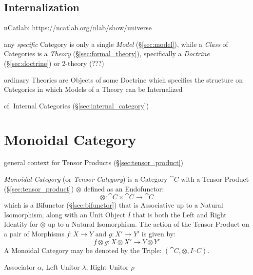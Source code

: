 


\subsection{Internalization}\label{sec:internalization}

nCatlab: \url{https://ncatlab.org/nlab/show/universe}

any \emph{specific} Category is only a single \emph{Model} (\S\ref{sec:model}),
while a \emph{Class} of Categories is a \emph{Theory}
(\S\ref{sec:formal_theory}), specifically a \emph{Doctrine}
(\S\ref{sec:doctrine}) or 2-theory (???)

ordinary Theories are Objects of some Doctrine which specifies the
structure on Categories in which Models of a Theory can be
Internalized

\fist cf. Internal Categories (\S\ref{sec:internal_category})



\section{Monoidal Category}\label{sec:monoidal_category}

general context for Tensor Products (\S\ref{sec:tensor_product})

\emph{Monoidal Category} (or \emph{Tensor Category}) is a Category
$\cat{C}$ with a Tensor Product (\S\ref{sec:tensor_product})
$\otimes$ defined as an Endofunctor:
\[
  \otimes : \cat{C} \times \cat{C} \rightarrow \cat{C}
\]
which is a Bifunctor (\S\ref{sec:bifunctor}) that is Associative up to
a Natural Isomorphism, along with an Unit Object $I$ that is both the
Left and Right Identity for $\otimes$ up to a Natural Isomorphism. The
action of the Tensor Product on a pair of Morphisms $f : X \rightarrow
Y$ and $g : X' \rightarrow Y'$ is given by:
\[
  f \otimes g : X \otimes X' \rightarrow Y \otimes Y'
\]
A Monoidal Category may be denoted by the Triple: $(\cat{C},
\otimes, I_\cat{C})$.

Associator $\alpha$, Left Unitor $\lambda$, Right Unitor $\rho$

